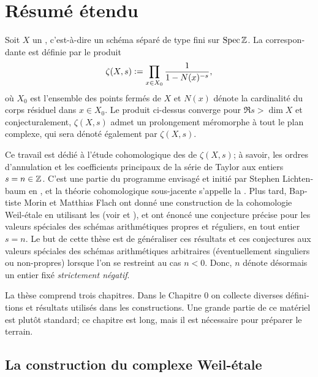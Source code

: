 \chapter*{Résumé étendu}

\begin{otherlanguage}{french} Soit $X$ un ,
  c'est-à-dire un schéma séparé de type fini sur $\operatorname{Spec} \mathbb{Z}$.
  La  correspondante est définie par le produit
  $$\zeta (X,s) \mathrel{\mathop:}= \prod_{x\in X_0} \frac{1}{1 - N (x)^{-s}},$$
  où $X_0$ est l'ensemble des points fermés de $X$ et $N (x)$ dénote la
  cardinalité du corps résiduel dans $x\in X_0$. Le produit ci-dessus converge
  pour $\Re s > \dim X$ et conjecturalement, $\zeta (X,s)$ admet un prolongement
  méromorphe à tout le plan complexe, qui sera dénoté également par $\zeta (X,s)$.

  Ce travail est dédié à l'étude cohomologique des  de
  $\zeta (X,s)$; à savoir, les ordres d'annulation et les coefficients principaux
  de la série de Taylor aux entiers $s = n \in \mathbb{Z}$. C'est une partie du programme
  envisagé et initié par Stephen Lichtenbaum en
  \cite{Lichtenbaum-05,Lichtenbaum-09-Euler,Lichtenbaum-09-number-rings}, et la
  théorie cohomologique sous-jacente s'appelle la
  . Plus tard, Baptiste Morin et Matthias Flach ont
  donné une construction de la cohomologie Weil-étale en utilisant les
   (voir \cite{Morin-14} et
  \cite{Flach-Morin-16}), et ont énoncé une conjecture précise pour les valeurs
  spéciales des schémas arithmétiques propres et réguliers, en tout entier
  $s=n$. Le but de cette thèse est de généraliser ces résultats et ces
  conjectures aux valeurs spéciales des schémas arithmétiques arbitraires
  (éventuellement singuliers ou non-propres) lorsque l'on se restreint au cas
  $n<0$. Donc, $n$ dénote désormais un entier fixé \emph{strictement négatif}.

  \vspace{1em}

  La thèse comprend trois chapitres. Dans le Chapitre 0 on collecte diverses
  définitions et résultats utilisés dans les constructions. Une grande partie de
  ce matériel est plutôt standard; ce chapitre est long, mais il est nécessaire
  pour préparer le terrain.

  \section*{La construction du complexe Weil-étale}


\end{otherlanguage}
